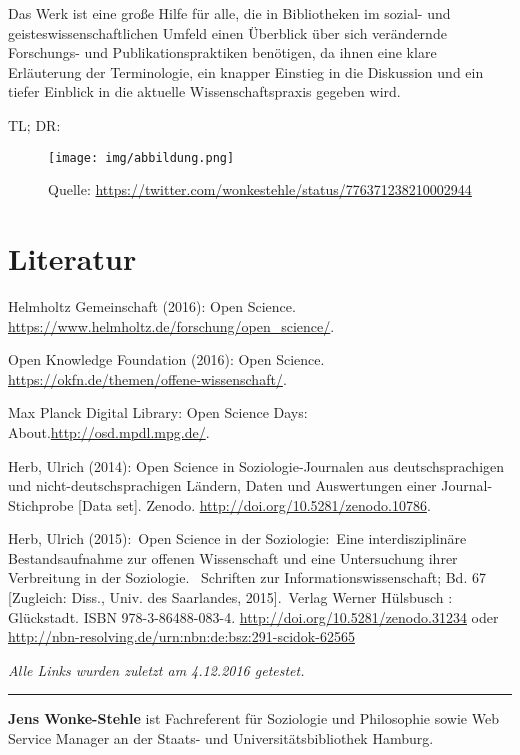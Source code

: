 \documentclass[a4paper,
fontsize=11pt,
oneside,
numbers=noperiodatend,
parskip=half-,
bibliography=totoc,
final
]{scrartcl}
\begin{document}
Das Werk ist eine große Hilfe für alle, die in Bibliotheken im sozial-
und geisteswissenschaftlichen Umfeld einen Überblick über sich
verändernde Forschungs- und Publikationspraktiken benötigen, da ihnen
eine klare Erläuterung der Terminologie, ein knapper Einstieg in die
Diskussion und ein tiefer Einblick in die aktuelle Wissenschaftspraxis
gegeben wird.

TL; DR:

\begin{figure}
\centering
\texttt{[image: img/abbildung.png]}
\caption{Quelle:
\url{https://twitter.com/wonkestehle/status/776371238210002944}}
\end{figure}

\section*{Literatur}\label{literatur}

Helmholtz Gemeinschaft (2016): Open Science.
\url{https://www.helmholtz.de/forschung/open_science/}.

Open Knowledge Foundation (2016): Open Science.
\url{https://okfn.de/themen/offene-wissenschaft/}.

Max Planck Digital Library: Open Science Days:
About.\url{http://osd.mpdl.mpg.de/}.

Herb, Ulrich (2014): Open Science in Soziologie-Journalen aus
deutschsprachigen und nicht-deutschsprachigen Ländern, Daten und
Auswertungen einer Journal-Stichprobe {[}Data set{]}. Zenodo.
\url{http://doi.org/10.5281/zenodo.10786}.

Herb, Ulrich (2015):~Open Science in der Soziologie:~Eine
interdisziplinäre Bestandsaufnahme zur offenen Wissenschaft und eine
Untersuchung ihrer Verbreitung in der Soziologie. ~Schriften zur
Informationswissenschaft; Bd. 67 {[}Zugleich: Diss., Univ. des
Saarlandes, 2015{]}.~Verlag Werner Hülsbusch : Glückstadt. ISBN
978-3-86488-083-4. \url{http://doi.org/10.5281/zenodo.31234} oder
\url{http://nbn-resolving.de/urn:nbn:de:bsz:291-scidok-62565}

\emph{Alle Links wurden zuletzt am 4.12.2016 getestet.}

\begin{center}\rule{0.5\linewidth}{\linethickness}\end{center}

\textbf{Jens Wonke-Stehle} ist Fachreferent für Soziologie und
Philosophie sowie Web Service Manager an der Staats- und
Universitätsbibliothek Hamburg.
\end{document}
